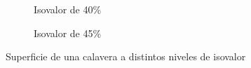 \begin{figure}[h]
\begin{subfigure}[b]{0.30\textwidth}
{		}
		\caption{Isovalor de 40\%}
	\end{subfigure}
	\quad
	\begin{subfigure}[b]{0.30\textwidth}
		\centering
		\caption{Isovalor de 45\%}
	\end{subfigure}



	\caption{Superficie de una calavera a distintos niveles de isovalor}
	\label{c:flujo:superficieDeUnaCalaveraADistintosNivelesDeIsovalor}

\end{figure}

